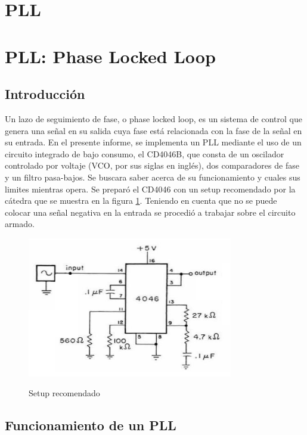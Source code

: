 \section{PLL}

\section{PLL: Phase Locked Loop}

\subsection{Introducción}

Un lazo de seguimiento de fase, o phase locked loop, es un sistema de control que genera una señal en su salida cuya fase está relacionada con la fase de la señal en su entrada. En el presente informe, se implementa un PLL mediante el uso de un circuito integrado de bajo consumo, el CD4046B, que consta de un oscilador controlado por voltaje (VCO, por sus siglas en inglés), dos comparadores de fase y un filtro pasa-bajos. Se buscara saber acerca de su funcionamiento y cuales sus limites mientras opera. 
Se preparó el CD4046 con un setup recomendado por la cátedra que se muestra en la figura \ref{fig:Circuito PLL}. Teniendo en cuenta que no se puede colocar una señal negativa en la entrada se procedió a trabajar sobre el circuito armado.

\begin{figure}[h!]
	\centering
	\includegraphics[width= 0.8\textwidth]{../1. PLL/Imagenes/Circuito PLL.png} 
	\label{fig:Circuito PLL}
	\caption{Setup recomendado}
\end{figure}

\subsection{Funcionamiento de un PLL}

